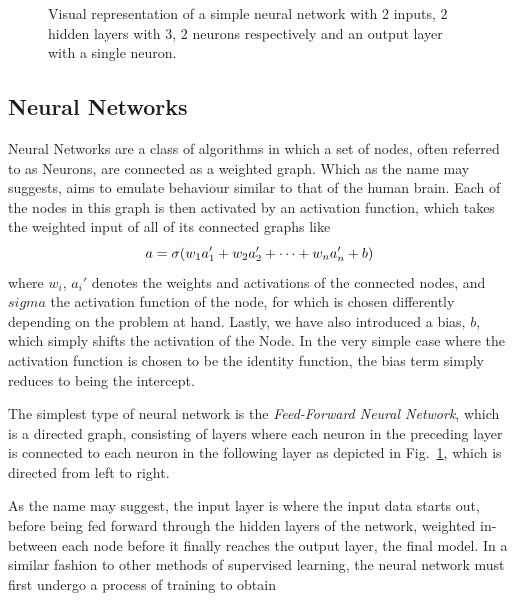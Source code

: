 \documentclass[reprint, english, nofootinbib]{revtex4-2}
\begin{document}
\begin{figure}[h!tb]
    \center
    \vspace{5mm} %
    
    \caption{\label{fig: NN Fig} Visual representation of a simple neural network with $2$ inputs, $2$ hidden layers with $3$, $2$ neurons respectively and an output layer with a single neuron.}
\end{figure}

\subsection{Neural Networks}
\noindent
Neural Networks are a class of algorithms in which a set of nodes, often referred to as Neurons, are connected as a weighted graph. Which as the name may suggests, aims to emulate behaviour similar to that of the human brain. Each of the nodes in this graph is then activated by an activation function, which takes the weighted input of all of its connected graphs like
\begin{equation}
    a = \sigma\qty(w_1 a_1' + w_2 a_2' + \dots + w_n a_n' + b)
\end{equation}
where $w_i$, $a_i'$ denotes the weights and activations of the connected nodes, and $sigma$ the activation function of the node, for which is chosen differently depending on the problem at hand. Lastly, we have also introduced a bias, $b$, which simply shifts the activation of the Node. In the very simple case where the activation function is chosen to be the identity function, the bias term simply reduces to being the intercept.

The simplest type of neural network is the \textit{Feed-Forward Neural Network}, which is a directed graph, consisting of layers where each neuron in the preceding layer is connected to each neuron in the following layer as depicted in Fig.~\ref{fig: NN Fig}, which is directed from left to right.

As the name may suggest, the input layer is where the input data starts out, before being fed forward through the hidden layers of the network, weighted in-between each node before it finally reaches the output layer, the final model. In a similar fashion to other methods of supervised learning, the neural network must first undergo a process of training to obtain
\end{document}
